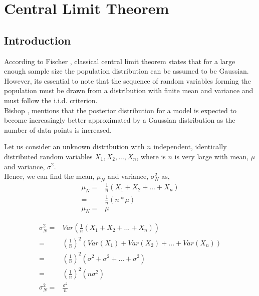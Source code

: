 \documentclass[12pt,twoside,a4paper]{article}
\begin{document}
\section{Central Limit Theorem}

\subsection{Introduction}

According to Fischer \cite{CLT}, classical central limit theorem states that for a large enough sample size the population distribution can be assumed to be Gaussian. However, its essential to note that the sequence of random variables forming the population must be drawn from a distribution with finite mean and variance and must follow the i.i.d. criterion. \\
Bishop \cite{ChrisPRML}, mentions that the posterior distribution for a model is expected to become increasingly better approximated by a Gaussian distribution as the number of data points is increased.

Let us consider an unknown distribution with $n$ independent, identically distributed random variables $X_1, X_2, ..., X_n$, where is $n$ is very large with mean, $\mu$ and variance, $\sigma^2$. \\

Hence, we can find the mean, $\mu_N$ and variance, $\sigma^2_N$ as,
\begin{align}
\mu_N =& \frac{1}{n}(X_1+X_2+...+X_n) \\
      =& \frac{1}{n}(n*\mu) \\
\mu_N =& \mu
\end{align}

\begin{align}
\sigma^2_N =& Var\left( \frac{1}{n}(X_1+X_2+...+X_n) \right ) \\
           =& \left( \frac{1}{n} \right )^2 \left(Var(X_1)+Var(X_2)+...+Var(X_n) \right ) \\
           =& \left( \frac{1}{n} \right )^2 \left(\sigma^2+\sigma^2+...+\sigma^2 \right ) \\
           =& \left( \frac{1}{n} \right )^2(n\sigma^2) \\
\sigma^2_N =& \frac{\sigma^2}{n}
\end{align}
\end{document}
